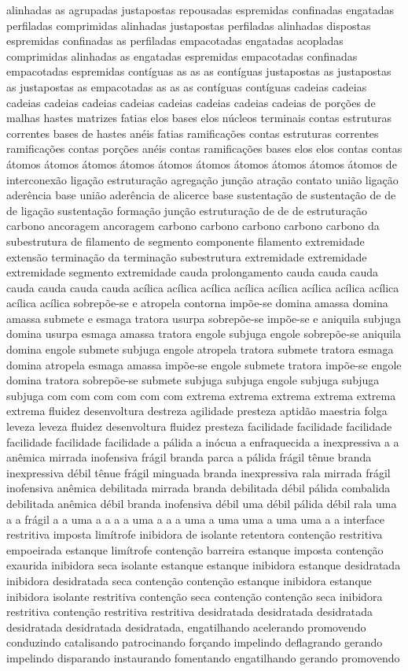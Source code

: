 alinhadas as agrupadas justapostas repousadas espremidas confinadas engatadas perfiladas comprimidas alinhadas justapostas perfiladas alinhadas dispostas espremidas confinadas as perfiladas empacotadas engatadas acopladas comprimidas alinhadas as engatadas espremidas empacotadas confinadas empacotadas espremidas contíguas as as as contíguas justapostas as justapostas as justapostas as empacotadas as as as contíguas contíguas cadeias cadeias cadeias cadeias cadeias cadeias cadeias cadeias cadeias cadeias de porções de malhas hastes matrizes fatias elos bases elos núcleos terminais contas estruturas correntes bases de hastes anéis fatias ramificações contas estruturas correntes ramificações contas porções anéis contas ramificações bases elos elos contas contas átomos átomos átomos átomos átomos átomos átomos átomos átomos átomos de interconexão ligação estruturação agregação junção atração contato união ligação aderência base união aderência de alicerce base sustentação de sustentação de de de ligação sustentação formação junção estruturação de de de estruturação carbono ancoragem ancoragem carbono carbono carbono carbono carbono da subestrutura de filamento de segmento componente filamento extremidade extensão terminação da terminação subestrutura extremidade extremidade extremidade segmento extremidade cauda prolongamento cauda cauda cauda cauda cauda cauda cauda acílica acílica acílica acílica acílica acílica acílica acílica acílica acílica sobrepõe-se e atropela contorna impõe-se domina amassa domina amassa submete e esmaga tratora usurpa sobrepõe-se impõe-se e aniquila subjuga domina usurpa esmaga amassa tratora engole subjuga engole sobrepõe-se aniquila domina engole submete subjuga engole atropela tratora submete tratora esmaga domina atropela esmaga amassa impõe-se engole submete tratora impõe-se engole domina tratora sobrepõe-se submete subjuga subjuga engole subjuga subjuga subjuga com com com com com com extrema extrema extrema extrema extrema extrema fluidez desenvoltura destreza agilidade presteza aptidão maestria folga leveza leveza fluidez desenvoltura fluidez presteza facilidade facilidade facilidade facilidade facilidade facilidade a pálida a inócua a enfraquecida a inexpressiva a a anêmica mirrada inofensiva frágil branda parca a pálida frágil tênue branda inexpressiva débil tênue frágil minguada branda inexpressiva rala mirrada frágil inofensiva anêmica debilitada mirrada branda debilitada débil pálida combalida debilitada anêmica débil branda inofensiva débil uma débil pálida débil rala uma a a frágil a a uma a a a a uma a a a uma a uma uma a uma uma a a interface restritiva imposta limítrofe inibidora de isolante retentora contenção restritiva empoeirada estanque limítrofe contenção barreira estanque imposta contenção exaurida inibidora seca isolante estanque estanque inibidora estanque desidratada inibidora desidratada seca contenção contenção estanque inibidora estanque inibidora isolante restritiva contenção seca contenção contenção seca inibidora restritiva contenção restritiva restritiva desidratada desidratada desidratada desidratada desidratada desidratada, engatilhando acelerando promovendo conduzindo catalisando patrocinando forçando impelindo deflagrando gerando impelindo disparando instaurando fomentando engatilhando gerando promovendo 